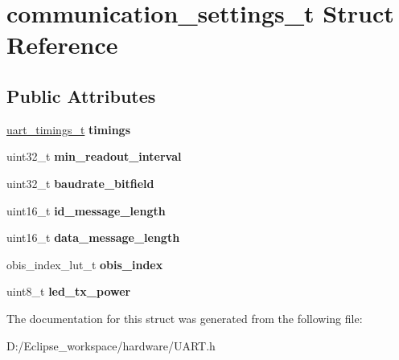 \hypertarget{structcommunication__settings__t}{}\section{communication\+\_\+settings\+\_\+t Struct Reference}
\label{structcommunication__settings__t}
\subsection*{Public Attributes}
\begin{DoxyCompactItemize}
\item 
\hypertarget{structcommunication__settings__t_ab72e88e1f8c21c438dc8c28b36e18c45}{}\hyperlink{structuart__timings__t}{uart\+\_\+timings\+\_\+t} {\bfseries timings}\label{structcommunication__settings__t_ab72e88e1f8c21c438dc8c28b36e18c45}

\item 
\hypertarget{structcommunication__settings__t_a6fdc89ca4fb2ea3207aeaa7d601b104a}{}uint32\+\_\+t {\bfseries min\+\_\+readout\+\_\+interval}\label{structcommunication__settings__t_a6fdc89ca4fb2ea3207aeaa7d601b104a}

\item 
\hypertarget{structcommunication__settings__t_a9cb084dd690ba75fcd2e65c86766396e}{}uint32\+\_\+t {\bfseries baudrate\+\_\+bitfield}\label{structcommunication__settings__t_a9cb084dd690ba75fcd2e65c86766396e}

\item 
\hypertarget{structcommunication__settings__t_ac0f4a187d2caa5dc9fc2fcab05c61513}{}uint16\+\_\+t {\bfseries id\+\_\+message\+\_\+length}\label{structcommunication__settings__t_ac0f4a187d2caa5dc9fc2fcab05c61513}

\item 
\hypertarget{structcommunication__settings__t_a7eb5e737a760b6622d089e8c3e53c6c4}{}uint16\+\_\+t {\bfseries data\+\_\+message\+\_\+length}\label{structcommunication__settings__t_a7eb5e737a760b6622d089e8c3e53c6c4}

\item 
\hypertarget{structcommunication__settings__t_acdf656a00353125bc2c6ad53a85a028e}{}obis\+\_\+index\+\_\+lut\+\_\+t {\bfseries obis\+\_\+index}\label{structcommunication__settings__t_acdf656a00353125bc2c6ad53a85a028e}

\item 
\hypertarget{structcommunication__settings__t_a8635c25ad7689674c3a85098c57074f7}{}uint8\+\_\+t {\bfseries led\+\_\+tx\+\_\+power}\label{structcommunication__settings__t_a8635c25ad7689674c3a85098c57074f7}

\end{DoxyCompactItemize}


The documentation for this struct was generated from the following file\+:\begin{DoxyCompactItemize}
\item 
D\+:/\+Eclipse\+\_\+workspace/hardware/U\+A\+R\+T.\+h\end{DoxyCompactItemize}
